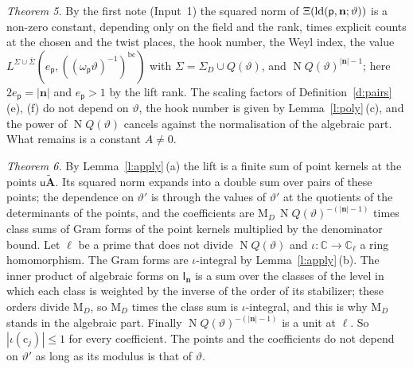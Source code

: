 \documentclass[11pt,a4paper]{article}
\makeatletter
\theoremstyle{plainx}
\theoremstyle{uprightx}
\renewenvironment{proof}[1][Proof]{\par\pushQED{\qed}\normalfont\topsep0pt\partopsep0pt
  \trivlist\item[\hskip\labelsep\itshape #1.]\ignorespaces}{\popQED\endtrivlist\@endpefalse}
\newcommand{\bn}{\mathbf{n}}
\newcommand{\sI}{\mathsf{I}}
\newcommand{\pp}{\mathsf{p}}
\newcommand{\rc}{\mathrm{c}}
\newcommand{\CC}{\mathbb{C}}
\newcommand{\Np}{\operatorname{N}}
\makeatother
\begin{document}
\begin{proof}[Proof of Theorems 5 and 6]
\emph{Theorem 5.} By the first note (Input~1) the squared norm of $\trivialLift{\lValueData{\pp,\bn}{\vartheta}}$ is
a non-zero constant, depending only on the field and the rank, times explicit counts at the chosen and the twist places, the hook number,
the Weyl index, the value $L^{\Sigma\cup\bar\Sigma}(e_{\pp},((\omega_{\pp}\vartheta)^{-1})^{\mathrm{bc}})$ with
$\Sigma=\Sigma_D\cup Q(\vartheta)$, and $\Np Q(\vartheta)^{|\bn|-1}$; here $2e_{\pp}=|\bn|$ and $e_{\pp}>1$ by the
lift rank. The scaling factors of
Definition~\ref{d:pairs}\,(e), (f) do not depend on $\vartheta$, the hook number is given by
Lemma~\ref{l:poly}\,(c), and the power of $\Np Q(\vartheta)$ cancels against the normalisation of the algebraic
part. What remains is a constant $A\ne0$.

\emph{Theorem 6.} By Lemma~\ref{l:apply}\,(a) the lift is a finite sum of point kernels at the points
$\mathsf{u}\tilde{\mathbf{A}}$. Its squared norm expands into a double sum over pairs of these points; the
dependence on $\vartheta'$ is through the values of $\vartheta'$ at the quotients of the determinants of the
points, and the coefficients are $\mathrm{M}_D\,\Np Q(\vartheta)^{-(|\bn|-1)}$ times class sums of Gram forms of
the point kernels multiplied by the denominator bound. Let $\ell$ be a prime that does not divide
$\Np Q(\vartheta)$ and $\iota\colon\CC\to\CC_\ell$ a ring homomorphism. The Gram forms are $\iota$-integral by
Lemma~\ref{l:apply}\,(b). The inner product of algebraic forms on $\sI_{\bn}$ is a sum over the classes of the
level in which each class is weighted by the inverse of the order of its stabilizer; these orders divide
$\mathrm{M}_D$, so $\mathrm{M}_D$ times the class sum is $\iota$-integral, and this is why $\mathrm{M}_D$ stands in the
algebraic part. Finally $\Np Q(\vartheta)^{-(|\bn|-1)}$ is a unit at $\ell$. So $|\iota(\rc_{j})|\le1$ for every
coefficient. The points and the coefficients do not depend on $\vartheta'$ as long as its modulus is that of
$\vartheta$.
\end{proof}
\end{document}
